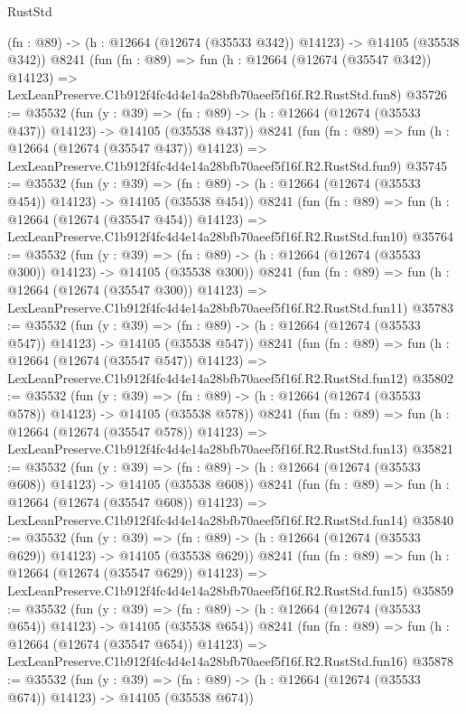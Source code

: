 \begin{lexlean}{RustStd}
\begin{coremodule}
    (fn : @89) -> (h : @12664 (@12674 (@35533 @342)) @14123) -> @14105 (@35538 @342))
    @8241
    (fun (fn : @89) =>
    fun (h : @12664 (@12674 (@35547 @342)) @14123) =>
    LexLeanPreserve.C1b912f4fc4d4e14a28bfb70aeef5f16f.R2.RustStd.fun8)
@35726 := @35532
    (fun (y : @39) =>
    (fn : @89) -> (h : @12664 (@12674 (@35533 @437)) @14123) -> @14105 (@35538 @437))
    @8241
    (fun (fn : @89) =>
    fun (h : @12664 (@12674 (@35547 @437)) @14123) =>
    LexLeanPreserve.C1b912f4fc4d4e14a28bfb70aeef5f16f.R2.RustStd.fun9)
@35745 := @35532
    (fun (y : @39) =>
    (fn : @89) -> (h : @12664 (@12674 (@35533 @454)) @14123) -> @14105 (@35538 @454))
    @8241
    (fun (fn : @89) =>
    fun (h : @12664 (@12674 (@35547 @454)) @14123) =>
    LexLeanPreserve.C1b912f4fc4d4e14a28bfb70aeef5f16f.R2.RustStd.fun10)
@35764 := @35532
    (fun (y : @39) =>
    (fn : @89) -> (h : @12664 (@12674 (@35533 @300)) @14123) -> @14105 (@35538 @300))
    @8241
    (fun (fn : @89) =>
    fun (h : @12664 (@12674 (@35547 @300)) @14123) =>
    LexLeanPreserve.C1b912f4fc4d4e14a28bfb70aeef5f16f.R2.RustStd.fun11)
@35783 := @35532
    (fun (y : @39) =>
    (fn : @89) -> (h : @12664 (@12674 (@35533 @547)) @14123) -> @14105 (@35538 @547))
    @8241
    (fun (fn : @89) =>
    fun (h : @12664 (@12674 (@35547 @547)) @14123) =>
    LexLeanPreserve.C1b912f4fc4d4e14a28bfb70aeef5f16f.R2.RustStd.fun12)
@35802 := @35532
    (fun (y : @39) =>
    (fn : @89) -> (h : @12664 (@12674 (@35533 @578)) @14123) -> @14105 (@35538 @578))
    @8241
    (fun (fn : @89) =>
    fun (h : @12664 (@12674 (@35547 @578)) @14123) =>
    LexLeanPreserve.C1b912f4fc4d4e14a28bfb70aeef5f16f.R2.RustStd.fun13)
@35821 := @35532
    (fun (y : @39) =>
    (fn : @89) -> (h : @12664 (@12674 (@35533 @608)) @14123) -> @14105 (@35538 @608))
    @8241
    (fun (fn : @89) =>
    fun (h : @12664 (@12674 (@35547 @608)) @14123) =>
    LexLeanPreserve.C1b912f4fc4d4e14a28bfb70aeef5f16f.R2.RustStd.fun14)
@35840 := @35532
    (fun (y : @39) =>
    (fn : @89) -> (h : @12664 (@12674 (@35533 @629)) @14123) -> @14105 (@35538 @629))
    @8241
    (fun (fn : @89) =>
    fun (h : @12664 (@12674 (@35547 @629)) @14123) =>
    LexLeanPreserve.C1b912f4fc4d4e14a28bfb70aeef5f16f.R2.RustStd.fun15)
@35859 := @35532
    (fun (y : @39) =>
    (fn : @89) -> (h : @12664 (@12674 (@35533 @654)) @14123) -> @14105 (@35538 @654))
    @8241
    (fun (fn : @89) =>
    fun (h : @12664 (@12674 (@35547 @654)) @14123) =>
    LexLeanPreserve.C1b912f4fc4d4e14a28bfb70aeef5f16f.R2.RustStd.fun16)
@35878 := @35532
    (fun (y : @39) =>
    (fn : @89) -> (h : @12664 (@12674 (@35533 @674)) @14123) -> @14105 (@35538 @674))

\end{coremodule}
\end{lexlean}
